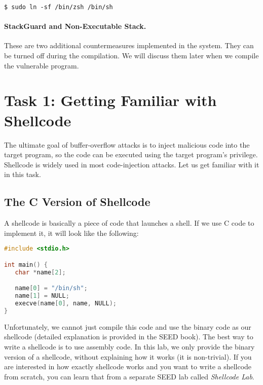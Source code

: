 \begin{lstlisting}
$ sudo ln -sf /bin/zsh /bin/sh
\end{lstlisting}


\paragraph{StackGuard and Non-Executable Stack.} These are 
two additional countermeasures implemented in the system. 
They can be turned off during the compilation.
We will discuss them later when we compile the vulnerable program.



\section{Task 1: Getting Familiar with Shellcode}

The ultimate goal of buffer-overflow attacks is to inject
malicious code into the target program, so the code can be 
executed using the target program's privilege.
Shellcode is widely used in most code-injection attacks. 
Let us get familiar with it in this task.



\subsection{The C Version of Shellcode} 

A shellcode is basically a piece of code that launches a shell. 
If we use C code to implement it, it will look like the following:


\begin{lstlisting}[language=C]
#include <stdio.h>

int main() {
   char *name[2];

   name[0] = "/bin/sh";
   name[1] = NULL;
   execve(name[0], name, NULL);
}
\end{lstlisting}
 
Unfortunately, we cannot just compile this code and use the binary code
as our shellcode (detailed explanation is provided in the SEED book). 
The best way to write a shellcode is to use assembly code. 
In this lab, we only provide the binary version of a shellcode,
without explaining how it works (it is non-trivial).
If you are interested in how exactly shellcode works 
and you want to write a shellcode from scratch, you
can learn that from a separate SEED lab called \textit{Shellcode Lab}.


